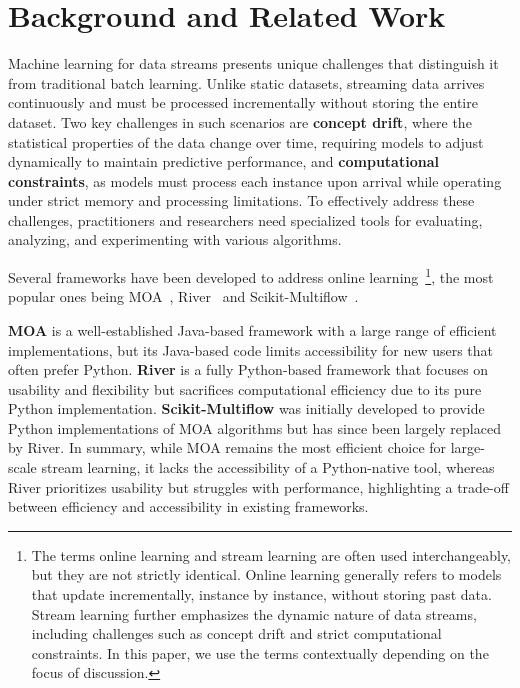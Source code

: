 \section{Background and Related Work}
Machine learning for data streams presents unique challenges that distinguish it from traditional batch learning. Unlike static datasets, streaming data arrives continuously and must be processed incrementally without storing the entire dataset. 
Two key challenges in such scenarios are \textbf{concept drift}, where the statistical properties of the data change over time, requiring models to adjust dynamically to maintain predictive performance, and \textbf{computational constraints}, as models must process each instance upon arrival while operating under strict memory and processing limitations. To effectively address these challenges, practitioners and researchers need specialized tools for evaluating, analyzing, and experimenting with various algorithms.

Several frameworks have been developed to address online learning~\footnote{The terms online learning and stream learning are often used interchangeably, but they are not strictly identical. Online learning generally refers to models that update incrementally, instance by instance, without storing past data. Stream learning further emphasizes the dynamic nature of data streams, including challenges such as concept drift and strict computational constraints. In this paper, we use the terms contextually depending on the focus of discussion.}, the most popular ones being MOA~\citep{ref_moa}, River~\citep{ref_river} and Scikit-Multiflow~\citep{ref_skmf}. 

\textbf{MOA} is a well-established Java-based framework with a large range of efficient implementations, but its Java-based code limits accessibility for new users that often prefer Python. \textbf{River} is a fully Python-based framework that focuses on usability and flexibility but sacrifices computational efficiency due to its pure Python implementation. \textbf{Scikit-Multiflow} was initially developed to provide Python implementations of MOA algorithms but has since been largely replaced by River. In summary, while MOA remains the most efficient choice for large-scale stream learning, it lacks the accessibility of a Python-native tool, whereas River prioritizes usability but struggles with performance, highlighting a trade-off between efficiency and accessibility in existing frameworks. 

